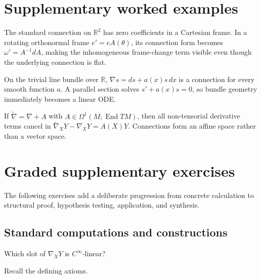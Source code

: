 \section{Supplementary worked examples}
\label{sec:vii21-pedagogy}

\begin{example}\label{ex:vii21-ped-01}
The standard connection on \(\mathbb R^2\) has zero coefficients in a Cartesian frame.  In a rotating orthonormal frame \(e'=eA(\theta)\), its connection form becomes \(\omega'=A^{-1}dA\), making the inhomogeneous frame-change term visible even though the underlying connection is flat.
\end{example}

\begin{example}\label{ex:vii21-ped-02}
On the trivial line bundle over \(\mathbb R\), \(\nabla s=ds+a(x)s\,dx\) is a connection for every smooth function \(a\).  A parallel section solves \(s'+a(x)s=0\), so bundle geometry immediately becomes a linear ODE.
\end{example}

\begin{example}\label{ex:vii21-ped-03}
If \(\widetilde\nabla=\nabla+A\) with \(A\in\Omega^1(M;\operatorname{End}TM)\), then all non-tensorial derivative terms cancel in \(\widetilde\nabla_XY-\nabla_XY=A(X)Y\).  Connections form an affine space rather than a vector space.
\end{example}

\section{Graded supplementary exercises}
The following exercises add a deliberate progression from concrete calculation to structural proof, hypothesis testing, application, and synthesis.

\subsection*{Standard computations and constructions}

\begin{exercise}\label{exr:vii21-ped-01}
Which slot of \(\nabla_XY\) is \(C^\infty\)-linear?
\end{exercise}

\begin{hint}
Recall the defining axioms.
\end{hint}

